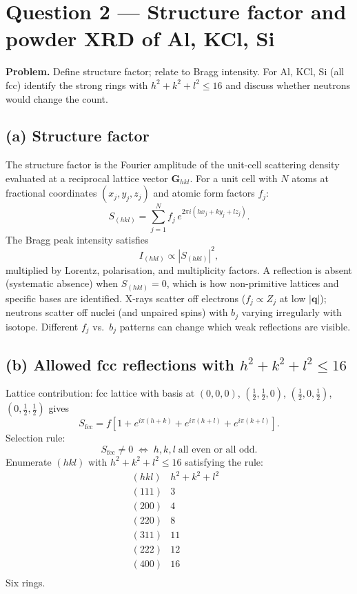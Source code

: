 \documentclass[11pt]{article}
\begin{document}
\section*{Question 2 --- Structure factor and powder XRD of Al, KCl, Si}

\textbf{Problem.} Define structure factor; relate to Bragg intensity. For Al, KCl, Si (all fcc) identify the strong rings with $h^{2}+k^{2}+l^{2}\le 16$ and discuss whether neutrons would change the count.

\subsection*{(a) Structure factor}

The structure factor is the Fourier amplitude of the unit-cell scattering density evaluated at a reciprocal lattice vector $\mathbf G_{hkl}$. For a unit cell with $N$ atoms at fractional coordinates $(x_{j},y_{j},z_{j})$ and atomic form factors $f_{j}$:
\[
\boxed{\;S_{(hkl)} = \sum_{j=1}^{N} f_{j}\,e^{2\pi i(h x_{j}+k y_{j}+l z_{j})}.\;}
\]
The Bragg peak intensity satisfies
\[
I_{(hkl)} \propto |S_{(hkl)}|^{2},
\]
multiplied by Lorentz, polarisation, and multiplicity factors. A reflection is absent (systematic absence) when $S_{(hkl)}=0$, which is how non-primitive lattices and specific bases are identified. X-rays scatter off electrons ($f_{j}\propto Z_{j}$ at low $|\mathbf q|$); neutrons scatter off nuclei (and unpaired spins) with $b_{j}$ varying irregularly with isotope. Different $f_{j}$ vs.\ $b_{j}$ patterns can change which weak reflections are visible.

\subsection*{(b) Allowed fcc reflections with $h^{2}+k^{2}+l^{2}\le 16$}

Lattice contribution: fcc lattice with basis at $(0,0,0)$, $(\tfrac12,\tfrac12,0)$, $(\tfrac12,0,\tfrac12)$, $(0,\tfrac12,\tfrac12)$ gives
\[
S_{\text{fcc}} = f\!\left[1 + e^{i\pi(h+k)} + e^{i\pi(h+l)} + e^{i\pi(k+l)}\right].
\]
Selection rule:
\[
S_{\text{fcc}} \neq 0\;\iff\;h,k,l\;\text{all even or all odd}.
\]
Enumerate $(hkl)$ with $h^{2}+k^{2}+l^{2}\le 16$ satisfying the rule:
\[
\begin{array}{c|c|c}
(hkl) & h^{2}+k^{2}+l^{2} & \\\hline
(111) & 3 & \\
(200) & 4 & \\
(220) & 8 & \\
(311) & 11 & \\
(222) & 12 & \\
(400) & 16 & \\
\end{array}
\]
Six rings.
\end{document}
